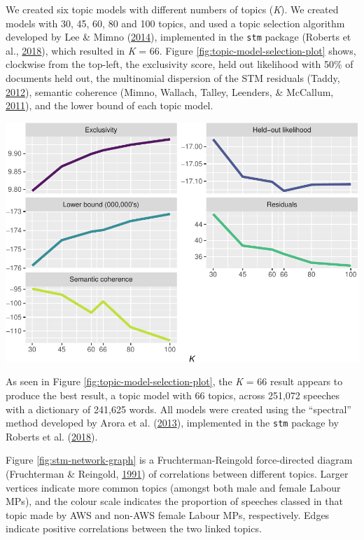 \documentclass[]{article}
\let\origfigure\figure
\let\endorigfigure\endfigure
\renewenvironment{figure}[1][2] {
    \expandafter\origfigure\expandafter[H]
} {
    \endorigfigure
}
\theoremstyle{definition}
\theoremstyle{definition}
\theoremstyle{definition}
\theoremstyle{remark}
\begin{document}
We created six topic models with different numbers of topics (\emph{K}).
We created models with 30, 45, 60, 80 and 100 topics, and used a topic
selection algorithm developed by Lee \& Mimno
(\protect\hyperlink{ref-lee2014c}{2014}), implemented in the
\texttt{stm} package (Roberts et al.,
\protect\hyperlink{ref-roberts2018}{2018}), which resulted in \emph{K} =
66. Figure \ref{fig:topic-model-selection-plot} shows, clockwise from
the top-left, the exclusivity score, held out likelihood with 50\% of
documents held out, the multinomial dispersion of the STM residuals
(Taddy, \protect\hyperlink{ref-taddy2012}{2012}), semantic coherence
(Mimno, Wallach, Talley, Leenders, \& McCallum,
\protect\hyperlink{ref-mimno2011}{2011}), and the lower bound of each
topic model.

\begin{figure}
\centering
\includegraphics{methodology_files/figure-latex/topic-model-selection-plot-1.pdf}
\caption{\label{fig:topic-model-selection-plot}Topic Model Selection}
\end{figure}

As seen in Figure \ref{fig:topic-model-selection-plot}, the \emph{K} =
66 result appears to produce the best result, a topic model with 66
topics, across 251,072 speeches with a dictionary of 241,625 words. All
models were created using the ``spectral'' method developed by Arora et
al. (\protect\hyperlink{ref-arora2013}{2013}), implemented in the
\texttt{stm} package by Roberts et al.
(\protect\hyperlink{ref-roberts2018}{2018}).

Figure \ref{fig:stm-network-graph} is a Fruchterman-Reingold
force-directed diagram (Fruchterman \& Reingold,
\protect\hyperlink{ref-fruchterman1991}{1991}) of correlations between
different topics. Larger vertices indicate more common topics (amongst
both male and female Labour MPs), and the colour scale indicates the
proportion of speeches classed in that topic made by AWS and non-AWS
female Labour MPs, respectively. Edges indicate positive correlations
between the two linked topics.
\end{document}
